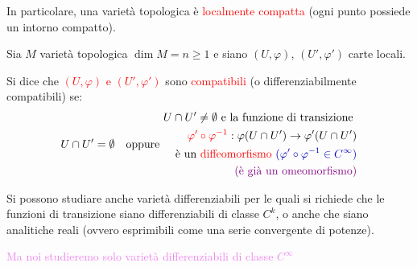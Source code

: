         \begin{osservazione}
        In particolare, una varietà topologica è \textcolor{red}{localmente compatta} (ogni punto possiede un intorno compatto).
        \end{osservazione}
        \newpage
        \begin{definizione}
        \mbox{}

        Sia $M$ varietà topologica $\dim M = n \ge 1$ e siano $(U, \varphi)$, $(U', \varphi')$ carte locali. 

        Si dice che \textcolor{red}{$(U, \varphi)$ e $(U', \varphi')$} sono \textcolor{red}{compatibili} \textcolor{blu}{(o differenziabilmente compatibili)} se:
            \[  U \cap U' = \emptyset \quad \text{oppure } \begin{aligned} U \cap U' \neq \emptyset \text{ e la funzione di transizione } \\
                 \textcolor{red}{\varphi' \circ \varphi^{-1}} : \varphi(U \cap U') \to \varphi'(U \cap U') \\  
                \text{è un \textcolor{red}{diffeomorfismo }}  \textcolor{blu}{(\varphi ' \circ \varphi^{-1} \in C^\infty)} \\ 
                \textcolor{violet}{\text{(è già un omeomorfismo)}} \end{aligned} \] 
        \end{definizione}

        \begin{osservazione}
        Si possono studiare anche varietà differenziabili per le quali si richiede che le funzioni di transizione siano differenziabili di classe $C^k$, o anche che siano analitiche reali 
        (ovvero esprimibili come una serie convergente di potenze).

        \textcolor{violet}{Ma noi studieremo solo varietà differenziabili di classe $C^\infty$}
        \end{osservazione}
